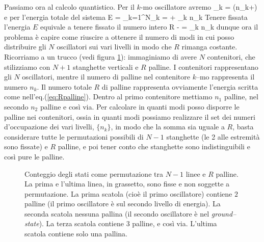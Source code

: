 Passiamo ora al calcolo quantistico. Per il $k$-mo oscillatore avremo
\be
\epsilon_k = \left(n_k+\right)\hbar\omega
\ee
e per l'energia totale del sistema
\be
E = \sum_{k=1}^N\epsilon_k =  + \hbar\omega\sum_k n_k
\ee
Tenere fissata l'energia $E$ equivale a tenere fissato il numero intero
\be
\label{eq:Rpalline}
R \equiv {} -  = \sum_k n_k
\ee
dunque ora il problema è capire come riuscire a ottenere il numero di modi in cui posso distribuire gli $N$ oscillatori sui vari livelli in modo che $R$ rimanga costante. Ricorriamo a un trucco (vedi figura \ref{fig:scapal}): immaginiamo di avere $N$ contenitori, che stilizziamo con $N+1$ stanghette verticali e $R$ palline. I contenitori rappresentano gli $N$ oscillatori, mentre il numero di palline nel contenitore $k$--mo rappresenta il numero $n_k$. Il numero totale $R$ di palline rappresenta ovviamente l'energia scritta come nell'eq.(\ref{eq:Rpalline}). Dentro al primo contenitore mettiamo $n_1$ palline, nel secondo $n_2$ palline e così via. Per calcolare in quanti modi posso disporre le palline nei contenitori, ossia in quanti modi possiamo realizzare il set dei numeri d'occupazione dei vari livelli, $\{n_k\}$, in modo che la somma sia uguale a $R$, basta considerare tutte le permutazioni possibili di $N-1$ stanghette (le 2 alle estremità sono fissate) e $R$ palline, e poi tener conto che stanghette sono indistinguibili e così pure le palline. 
\begin{figure}[!ht]
  \centering
  
  \caption{Conteggio degli stati come permutazione tra $N-1$ linee e $R$ palline. La prima e l'ultima linea, in grassetto, sono fisse e non soggette a permutazione. La prima scatola (cioè il primo oscillatore) contiene $2$ palline (il primo oscillatore è sul secondo livello di energia). La seconda scatola nessuna pallina (il secondo oscillatore è nel {\em ground--state}). La terza scatola contiene $3$ palline, e così via. L'ultima scatola contiene solo una pallina.}
  \label{fig:scapal}
\end{figure}

